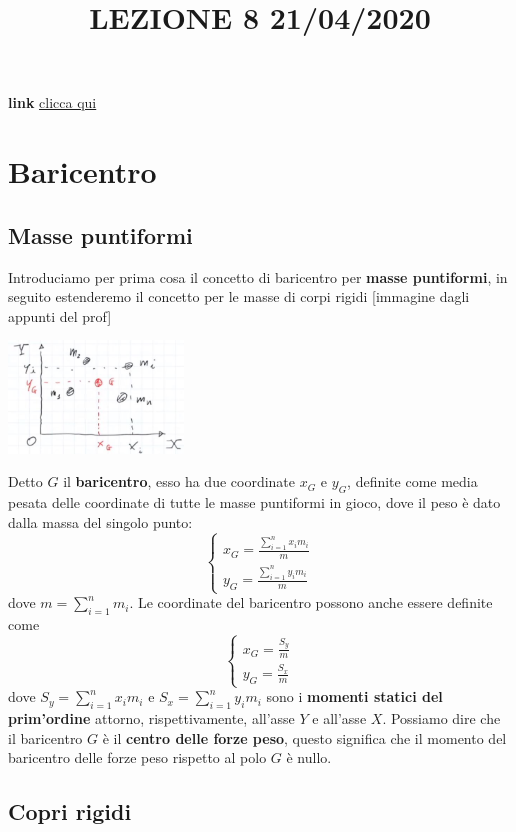\title{LEZIONE 8 21/04/2020}\newline
\textbf{link} \href{https://web.microsoftstream.com/video/daf8e418-03bf-40c5-8093-3391c41375be}{clicca qui}
\section{Baricentro}
\subsection{Masse puntiformi}
Introduciamo per prima cosa il concetto di baricentro per \textbf{masse puntiformi}, in seguito estenderemo il concetto per le masse di corpi rigidi
[immagine dagli appunti del prof]
\begin{center}
    \includegraphics[height=3cm]{../lezione8/img1.JPG}
\end{center}
Detto $G$ il \textbf{baricentro}, esso ha due coordinate $x_G$ e $y_G$, definite come media pesata delle coordinate di tutte le masse puntiformi in gioco, dove il peso è dato dalla massa del singolo punto:
\[
    \begin{cases}
        x_G = \frac{\sum_{i=1}^{n} x_i m_i}{m}\\
        y_G = \frac{\sum_{i=1}^{n} y_i m_i}{m}
    \end{cases}
\]
dove $m = \sum_{i=1}^{n} m_i$.\newline
\newline
Le coordinate del baricentro possono anche essere definite come
\[
    \begin{cases}
        x_G = \frac{S_y}{m}\\
        y_G = \frac{S_x}{m}
    \end{cases}
\]
dove $S_y = \sum_{i=1}^{n} x_i m_i$ e $S_x = \sum_{i=1}^{n} y_i m_i$ sono i \textbf{momenti statici del prim'ordine} attorno, rispettivamente, all'asse $Y$ e all'asse $X$.\newline
\newline
Possiamo dire che  il baricentro $G$ è il \textbf{centro delle forze peso}, questo significa che il momento del baricentro delle forze peso rispetto al polo $G$ è nullo.\subsection{Copri rigidi}
